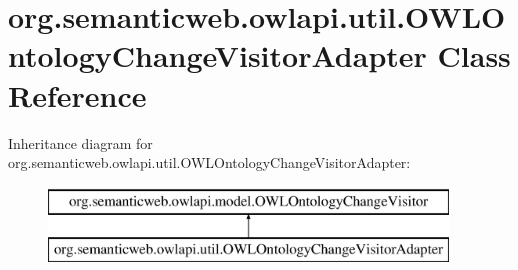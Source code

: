 \hypertarget{classorg_1_1semanticweb_1_1owlapi_1_1util_1_1_o_w_l_ontology_change_visitor_adapter}{\section{org.\-semanticweb.\-owlapi.\-util.\-O\-W\-L\-Ontology\-Change\-Visitor\-Adapter Class Reference}
\label{classorg_1_1semanticweb_1_1owlapi_1_1util_1_1_o_w_l_ontology_change_visitor_adapter}
}
Inheritance diagram for org.\-semanticweb.\-owlapi.\-util.\-O\-W\-L\-Ontology\-Change\-Visitor\-Adapter\-:\begin{figure}[H]
\begin{center}
\leavevmode
\includegraphics[height=2.000000cm]{classorg_1_1semanticweb_1_1owlapi_1_1util_1_1_o_w_l_ontology_change_visitor_adapter}
\end{center}
\end{figure}
